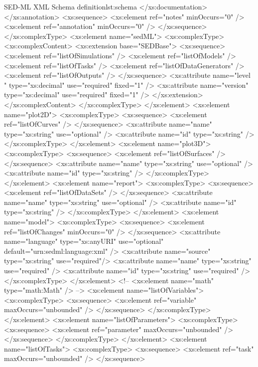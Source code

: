 \begin{myXmlLst}{SED-ML XML Schema definition}{lst:schema}
		</xs:documentation>
		</xs:annotation>
		<xs:sequence>
			<xs:element ref="notes" minOccurs="0" />
			<xs:element ref="annotation" minOccurs="0" />
		</xs:sequence>
	</xs:complexType>
	<xs:element name="sedML">
		<xs:complexType>
			<xs:complexContent>
				<xs:extension base="SEDBase">
					<xs:sequence>
						<xs:element ref="listOfSimulations" />
						<xs:element ref="listOfModels" />
						<xs:element ref="listOfTasks" />
						<xs:element ref="listOfDataGenerators" />
						<xs:element ref="listOfOutputs" />
					</xs:sequence>
					<xs:attribute name="level " type="xs:decimal" use="required"
						fixed="1" />
					<xs:attribute name="version" type="xs:decimal" use="required"
						fixed="1" />
				</xs:extension>
			</xs:complexContent>
		</xs:complexType>
	</xs:element>
	<xs:element name="plot2D">
		<xs:complexType>
			<xs:sequence>
				<xs:element ref="listOfCurves" />
			</xs:sequence>
			<xs:attribute name="name" type="xs:string" use="optional" />
			<xs:attribute name="id" type="xs:string" />
		</xs:complexType>
	</xs:element>
	<xs:element name="plot3D">
		<xs:complexType>
			<xs:sequence>
				<xs:element ref="listOfSurfaces" />
			</xs:sequence>
			<xs:attribute name="name" type="xs:string" use="optional" />
			<xs:attribute name="id" type="xs:string" />
		</xs:complexType>
	</xs:element>
	<xs:element name="report">
		<xs:complexType>
			<xs:sequence>
				<xs:element ref="listOfDataSets" />
			</xs:sequence>
			<xs:attribute name="name" type="xs:string" use="optional" />
			<xs:attribute name="id" type="xs:string" />
		</xs:complexType>
	</xs:element>
	<xs:element name="model">
		<xs:complexType>
			<xs:sequence>
				<xs:element ref="listOfChanges" minOccurs="0" />
			</xs:sequence>
			<xs:attribute name="language" type="xs:anyURI" use="optional" default="urn:sedml:language:xml" />
			<xs:attribute name="source" type="xs:string" use="required"/>
			<xs:attribute name="name" type="xs:string" use="required" />
			<xs:attribute name="id" type="xs:string" use="required" />
		</xs:complexType>
	</xs:element>
	<!--  <xs:element name="math" type="math:Math" /> -->
	<xs:element name="listOfVariables">
		<xs:complexType>
			<xs:sequence>
				<xs:element ref="variable" maxOccurs="unbounded" />
			</xs:sequence>
		</xs:complexType>
	</xs:element>
	<xs:element name="listOfParameters">
		<xs:complexType>
			<xs:sequence>
				<xs:element ref="parameter" maxOccurs="unbounded" />
			</xs:sequence>
		</xs:complexType>
	</xs:element>
	<xs:element name="listOfTasks">
		<xs:complexType>
			<xs:sequence>
				<xs:element ref="task" maxOccurs="unbounded" />
			</xs:sequence>

\end{myXmlLst}
